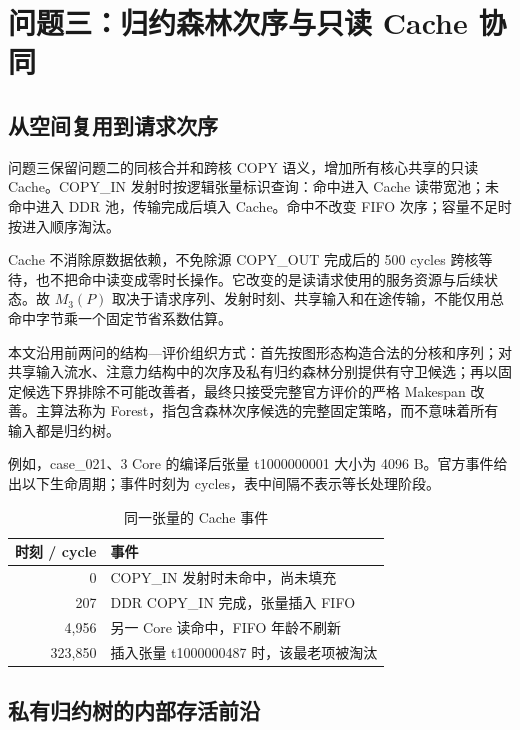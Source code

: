 \documentclass[anonymous,notoc]{gmcm2026}
\begin{document}
\FloatBarrier

\section{问题三：归约森林次序与只读 Cache 协同}\label{ux95eeux9898ux4e09ux5f52ux7ea6ux68eeux6797ux6b21ux5e8fux4e0eux53eaux8bfb-cache-ux534fux540c}

\subsection{从空间复用到请求次序}\label{ux4eceux7a7aux95f4ux590dux7528ux5230ux8bf7ux6c42ux6b21ux5e8f}

问题三保留问题二的同核合并和跨核 COPY 语义，增加所有核心共享的只读 Cache。COPY\_IN 发射时按逻辑张量标识查询：命中进入 Cache 读带宽池；未命中进入 DDR 池，传输完成后填入 Cache。命中不改变 FIFO 次序；容量不足时按进入顺序淘汰。

Cache 不消除原数据依赖，不免除源 COPY\_OUT 完成后的 500 cycles 跨核等待，也不把命中读变成零时长操作。它改变的是读请求使用的服务资源与后续状态。故 \(M_3(P)\) 取决于请求序列、发射时刻、共享输入和在途传输，不能仅用总命中字节乘一个固定节省系数估算。

本文沿用前两问的结构---评价组织方式：首先按图形态构造合法的分核和序列；对共享输入流水、注意力结构中的次序及私有归约森林分别提供有守卫候选；再以固定候选下界排除不可能改善者，最终只接受完整官方评价的严格 Makespan 改善。主算法称为 Forest，指包含森林次序候选的完整固定策略，而不意味着所有输入都是归约树。

例如，case\_021、3 Core 的编译后张量 t1000000001 大小为 4096 B。官方事件给出以下生命周期；事件时刻为 cycles，表中间隔不表示等长处理阶段。

\begin{table}[!htbp]\centering
\caption{同一张量的 Cache 事件}\label{tab:cache-events}
\begin{tabularx}{\linewidth}{rX}\toprule
时刻 / cycle & 事件 \\\midrule
0 & COPY\_IN 发射时未命中，尚未填充 \\
207 & DDR COPY\_IN 完成，张量插入 FIFO \\
4,956 & 另一 Core 读命中，FIFO 年龄不刷新 \\
323,850 & 插入张量 t1000000487 时，该最老项被淘汰 \\\bottomrule
\end{tabularx}\end{table}

\subsection{私有归约树的内部存活前沿}\label{ux79c1ux6709ux5f52ux7ea6ux6811ux7684ux5185ux90e8ux5b58ux6d3bux524dux6cbf}
\end{document}
